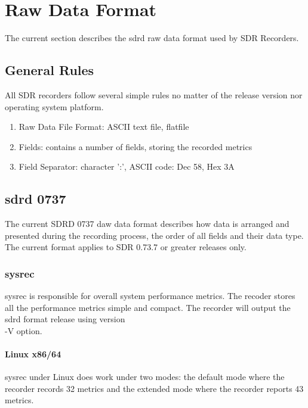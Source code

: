 
\chapter{Raw Data Format}
The current section describes the sdrd raw data format used by
SDR Recorders.

\section*{General Rules}
All SDR recorders follow several simple rules no matter of the release
version nor operating system platform.

\begin{enumerate}
\item Raw Data File Format: ASCII text file, flatfile
\item Fields: contains a number of fields, storing the recorded metrics
\item Field Separator: character ':', ASCII code: Dec 58, Hex 3A
\end{enumerate}


\section{sdrd 0737}
\noindent
The current SDRD 0737 daw data format describes how data is arranged and
presented during the recording process, the order of all fields and 
their data type. The current format applies to SDR 0.73.7 or greater
releases only.

\subsection*{sysrec}
sysrec is responsible for overall system performance metrics. The recoder
stores all the performance metrics simple and compact. The recorder
will output the sdrd format release using version \\-V option.


\subsubsection*{Linux x86/64}
sysrec under Linux does work under two modes: the default mode where the
recorder records 32 metrics and the extended mode where the recorder
reports 43 metrics.

